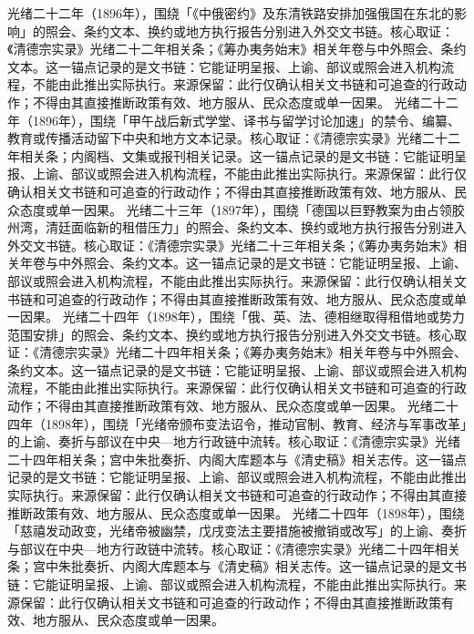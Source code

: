 光绪二十二年（1896年），围绕「《中俄密约》及东清铁路安排加强俄国在东北的影响」的照会、条约文本、换约或地方执行报告分别进入外交文书链。核心取证：《清德宗实录》光绪二十二年相关条；《筹办夷务始末》相关年卷与中外照会、条约文本。这一锚点记录的是文书链：它能证明呈报、上谕、部议或照会进入机构流程，不能由此推出实际执行。来源保留：此行仅确认相关文书链和可追查的行政动作；不得由其直接推断政策有效、地方服从、民众态度或单一因果。
光绪二十二年（1896年），围绕「甲午战后新式学堂、译书与留学讨论加速」的禁令、编纂、教育或传播活动留下中央和地方文本记录。核心取证：《清德宗实录》光绪二十二年相关条；内阁档、文集或报刊相关记录。这一锚点记录的是文书链：它能证明呈报、上谕、部议或照会进入机构流程，不能由此推出实际执行。来源保留：此行仅确认相关文书链和可追查的行政动作；不得由其直接推断政策有效、地方服从、民众态度或单一因果。
光绪二十三年（1897年），围绕「德国以巨野教案为由占领胶州湾，清廷面临新的租借压力」的照会、条约文本、换约或地方执行报告分别进入外交文书链。核心取证：《清德宗实录》光绪二十三年相关条；《筹办夷务始末》相关年卷与中外照会、条约文本。这一锚点记录的是文书链：它能证明呈报、上谕、部议或照会进入机构流程，不能由此推出实际执行。来源保留：此行仅确认相关文书链和可追查的行政动作；不得由其直接推断政策有效、地方服从、民众态度或单一因果。
光绪二十四年（1898年），围绕「俄、英、法、德相继取得租借地或势力范围安排」的照会、条约文本、换约或地方执行报告分别进入外交文书链。核心取证：《清德宗实录》光绪二十四年相关条；《筹办夷务始末》相关年卷与中外照会、条约文本。这一锚点记录的是文书链：它能证明呈报、上谕、部议或照会进入机构流程，不能由此推出实际执行。来源保留：此行仅确认相关文书链和可追查的行政动作；不得由其直接推断政策有效、地方服从、民众态度或单一因果。
光绪二十四年（1898年），围绕「光绪帝颁布变法诏令，推动官制、教育、经济与军事改革」的上谕、奏折与部议在中央—地方行政链中流转。核心取证：《清德宗实录》光绪二十四年相关条；宫中朱批奏折、内阁大库题本与《清史稿》相关志传。这一锚点记录的是文书链：它能证明呈报、上谕、部议或照会进入机构流程，不能由此推出实际执行。来源保留：此行仅确认相关文书链和可追查的行政动作；不得由其直接推断政策有效、地方服从、民众态度或单一因果。
光绪二十四年（1898年），围绕「慈禧发动政变，光绪帝被幽禁，戊戌变法主要措施被撤销或改写」的上谕、奏折与部议在中央—地方行政链中流转。核心取证：《清德宗实录》光绪二十四年相关条；宫中朱批奏折、内阁大库题本与《清史稿》相关志传。这一锚点记录的是文书链：它能证明呈报、上谕、部议或照会进入机构流程，不能由此推出实际执行。来源保留：此行仅确认相关文书链和可追查的行政动作；不得由其直接推断政策有效、地方服从、民众态度或单一因果。
